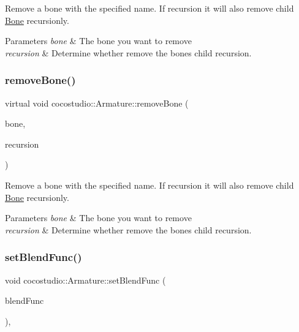 Remove a bone with the specified name. If recursion it will also remove child \hyperlink{classcocostudio_1_1Bone}{Bone} recursionly.


\begin{DoxyParams}{Parameters}
{\em bone} & The bone you want to remove \\
\hline
{\em recursion} & Determine whether remove the bone\textquotesingle{}s child recursion. \\
\hline
\end{DoxyParams}
\mbox{\label{classcocostudio_1_1Armature_aefa283cddbe9761986b4c76dd5301865}} 
\subsubsection{\texorpdfstring{remove\+Bone()}{removeBone()}\hspace{0.1cm}{\footnotesize\ttfamily [2/2]}}
{\footnotesize\ttfamily virtual void cocostudio\+::\+Armature\+::remove\+Bone (\begin{DoxyParamCaption}\item[{\hyperlink{classcocostudio_1_1Bone}{Bone} $\ast$}]{bone,  }\item[{bool}]{recursion }\end{DoxyParamCaption})\hspace{0.3cm}{\ttfamily [virtual]}}

Remove a bone with the specified name. If recursion it will also remove child \hyperlink{classcocostudio_1_1Bone}{Bone} recursionly.


\begin{DoxyParams}{Parameters}
{\em bone} & The bone you want to remove \\
\hline
{\em recursion} & Determine whether remove the bone\textquotesingle{}s child recursion. \\
\hline
\end{DoxyParams}
\mbox{\label{classcocostudio_1_1Armature_a2adcf2445626fd9ebbc52923960c567c}} 
\subsubsection{\texorpdfstring{set\+Blend\+Func()}{setBlendFunc()}\hspace{0.1cm}{\footnotesize\ttfamily [1/2]}}
{\footnotesize\ttfamily void cocostudio\+::\+Armature\+::set\+Blend\+Func (\begin{DoxyParamCaption}\item[{const cocos2d\+::\+Blend\+Func \&}]{blend\+Func }\end{DoxyParamCaption})\hspace{0.3cm}{\ttfamily [inline]}, {\ttfamily [override]}}

